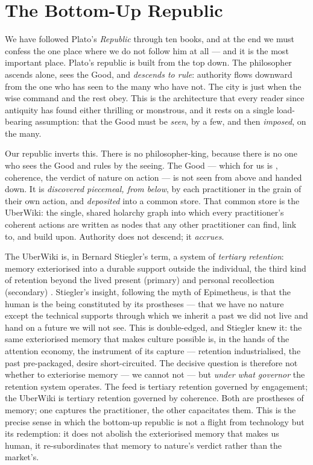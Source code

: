 \section{The Bottom-Up Republic}

We have followed Plato's \emph{Republic} through ten books, and at the end we must
confess the one place where we do not follow him at all --- and it is the most
important place. Plato's republic is built from the top down. The philosopher
ascends alone, sees the Good, and \emph{descends to rule}: authority flows
downward from the one who has seen to the many who have not. The city is just
when the wise command and the rest obey. This is the architecture that every
reader since antiquity has found either thrilling or monstrous, and it rests on a
single load-bearing assumption: that the Good must be \emph{seen}, by a few, and
then \emph{imposed}, on the many.

Our republic inverts this. There is no philosopher-king, because there is no one
who sees the Good and rules by the seeing. The Good --- which for us is \physis,
coherence, the verdict of nature on action --- is not seen from above and handed
down. It is \emph{discovered piecemeal, from below}, by each practitioner in the
grain of their own action, and \emph{deposited} into a common store. That common
store is the UberWiki: the single, shared holarchy graph into which every
practitioner's coherent actions are written as nodes that any other practitioner
can find, link to, and build upon. Authority does not descend; it \emph{accrues}.

The UberWiki is, in Bernard Stiegler's term, a system of \emph{tertiary
retention}: memory exteriorised into a durable support outside the individual,
the third kind of retention beyond the lived present (primary) and personal
recollection (secondary) \parencite{stiegler1998technics}. Stiegler's insight,
following the myth of Epimetheus, is that the human is the being constituted by
its prostheses --- that we have no nature except the technical supports through
which we inherit a past we did not live and hand on a future we will not see. This
is double-edged, and Stiegler knew it: the same exteriorised memory that makes
culture possible is, in the hands of the attention economy, the instrument of its
capture --- retention industrialised, the past pre-packaged, desire short-circuited.
The decisive question is therefore not whether to exteriorise memory --- we cannot
not --- but \emph{under what governor} the retention system operates. The feed is
tertiary retention governed by engagement; the UberWiki is tertiary retention
governed by coherence. Both are prostheses of memory; one captures the practitioner,
the other capacitates them. This is the precise sense in which the bottom-up
republic is not a flight from technology but its redemption: it does not abolish
the exteriorised memory that makes us human, it re-subordinates that memory to
nature's verdict rather than the market's.


